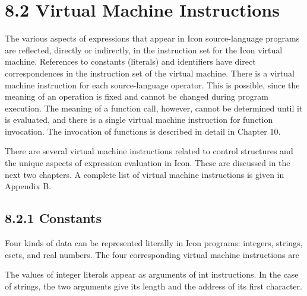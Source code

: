 \section[8.2 Virtual Machine Instructions]{8.2 Virtual Machine Instructions}

The various aspects of expressions that appear in Icon source-language
programs are reflected, directly or indirectly, in the instruction set
for the Icon virtual machine. References to constants (literals) and
identifiers have direct correspondences in the instruction set of the
virtual machine. There is a virtual machine instruction for each
source-language operator. This is possible, since the meaning of an
operation is fixed and cannot be changed during program execution. The
meaning of a function call, however, cannot be determined until it is
evaluated, and there is a single virtual machine instruction for
function invocation. The invocation of functions is described in
detail in Chapter 10.

There are several virtual machine instructions related to control
structures and the unique aspects of expression evaluation in
Icon. These are discussed in the next two chapters. A complete list of
virtual machine instructions is given in Appendix B.

\subsection[8.2.1 Constants]{8.2.1 Constants}

Four kinds of data can be represented literally in Icon programs:
integers, strings, csets, and real numbers. The four corresponding
virtual machine instructions are

\goodbreak
{}


The values of integer literals appear as arguments of int
instructions. In the case of strings, the two arguments give its
length and the address of its first character.

